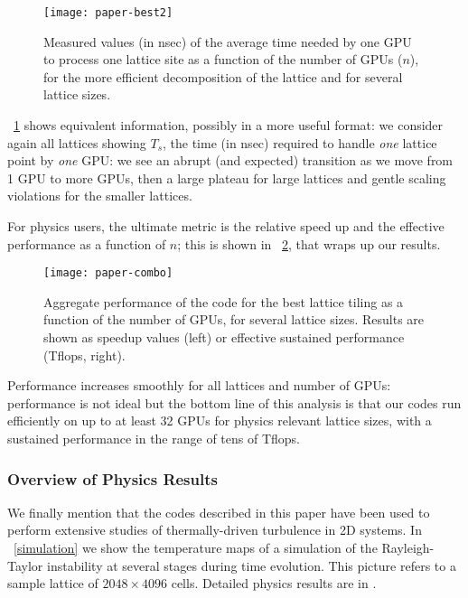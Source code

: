 \documentclass{elsarticle}
\begin{document}
\begin{figure}[t]
\centering
\texttt{[image: paper-best2]}
\caption{Measured values (in nsec) of the average time needed by one GPU 
to process one lattice site as a function of the number of GPUs ($n$), for the 
more efficient decomposition of the lattice and for several lattice sizes.}
\label{fig:best2}
\end{figure}

\figurename~\ref{fig:best2} shows equivalent information, possibly in a more useful format: 
we consider again all lattices showing $T_s$, the time (in nsec) 
required to handle {\em one} lattice point by {\em one} GPU: we see 
an abrupt (and expected) transition as we move from 1 GPU to more GPUs, 
then a large plateau for large lattices and gentle scaling violations for the smaller lattices.

For physics users, the ultimate metric is 
the relative speed up and the effective performance as a function 
of $n$; this is shown in \figurename~\ref{fig:combo}, that wraps up
our results. 
%
\begin{figure}[t]
\centering
\texttt{[image: paper-combo]}
\caption{Aggregate performance of the code for the best lattice tiling 
as a function of the number of GPUs, for several lattice sizes. Results 
are shown as speedup values (left) or effective sustained performance (Tflops, right). }
\label{fig:combo}
\end{figure}
%
Performance increases smoothly for all lattices and number of GPUs: performance is not ideal but the bottom line of this analysis
is that our codes run efficiently on up to at least 32 GPUs for 
physics relevant lattice sizes, with a sustained performance in the range
of tens of Tflops.

\subsubsection*{Overview of Physics Results}

We finally mention that the codes described in this paper have been used 
to perform extensive studies of thermally-driven turbulence in 2D systems.
%
In \figurename~\ref{simulation} we show the temperature maps of a simulation of
the Rayleigh-Taylor instability at several stages  during time evolution. This
picture refers to a sample lattice of $2048 \times 4096$ cells.
%
Detailed physics results are in \cite{noi1, noi2, frontpropagation}.
\end{document}

